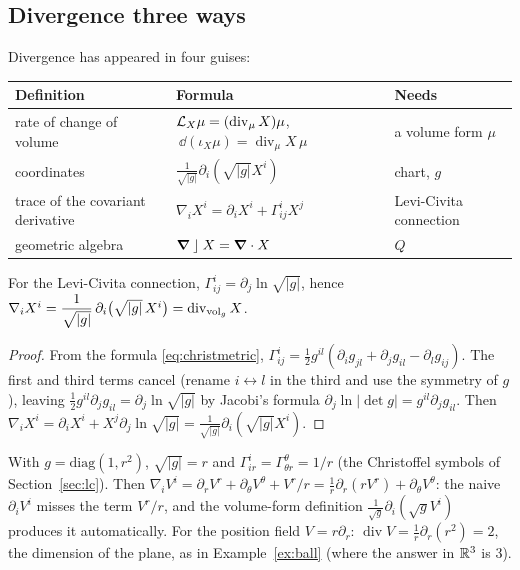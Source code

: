 \subsection{Divergence three ways}\label{sec:divthree}

Divergence has appeared in four guises:
\begin{center}
\small
\begin{tabular}{@{}p{4.1cm}p{5.4cm}p{4.6cm}@{}}
\toprule
\textbf{Definition} & \textbf{Formula} & \textbf{Needs}\\
\midrule
rate of change of volume & $\mathcal{L}_X\mu=(\operatorname{div}_\mu X)\mu$, $\ \dd(\iota_X\mu)=\operatorname{div}_\mu X\,\mu$ & a volume form $\mu$\\
coordinates & $\frac1{\sqrt{|g|}}\partial_i(\sqrt{|g|}X^i)$ & chart, $g$\\
trace of the covariant derivative & $\nabla_iX^i=\partial_iX^i+\Gamma^i_{ij}X^j$ & Levi-Civita connection\\
geometric algebra & $\boldsymbol{\nabla}\mathbin{\rfloor} X=\boldsymbol{\nabla}\cdot X$ & $Q$\\
\bottomrule
\end{tabular}
\end{center}

\begin{proposition}\label{prop:divagree}
For the Levi-Civita connection, $\Gamma^i_{ij}=\partial_j\ln\sqrt{|g|}$, hence $\nabla_iX^i=\dfrac1{\sqrt{|g|}}\,\partial_i\bigl(\sqrt{|g|}\,X^i\bigr)=\operatorname{div}_{\mathrm{vol}_g}X$.
\end{proposition}
\begin{proof}
From the formula \eqref{eq:christmetric}, $\Gamma^i_{ij}=\frac12g^{il}(\partial_ig_{jl}+\partial_jg_{il}-\partial_lg_{ij})$. The first and third terms cancel (rename $i\leftrightarrow l$ in the third and use the symmetry of $g$), leaving $\frac12g^{il}\partial_jg_{il}=\partial_j\ln\sqrt{|g|}$ by Jacobi's formula $\partial_j\ln|\det g|=g^{il}\partial_jg_{il}$. Then $\nabla_iX^i=\partial_iX^i+X^j\partial_j\ln\sqrt{|g|}=\frac1{\sqrt{|g|}}\partial_i(\sqrt{|g|}X^i)$.
\end{proof}

\begin{example}\label{ex:polardiv}
With $g=\mathrm{diag}(1,r^2)$, $\sqrt{|g|}=r$ and $\Gamma^i_{ir}=\Gamma^\theta_{\theta r}=1/r$ (the Christoffel symbols of Section~\ref{sec:lc}). Then $\nabla_iV^i=\partial_rV^r+\partial_\theta V^\theta+V^r/r=\frac1r\partial_r(rV^r)+\partial_\theta V^\theta$: the naive $\partial_iV^i$ misses the term $V^r/r$, and the volume-form definition $\frac1{\sqrt g}\partial_i(\sqrt gV^i)$ produces it automatically. For the position field $V=r\partial_r$: $\operatorname{div}V=\frac1r\partial_r(r^2)=2$, the dimension of the plane, as in Example~\ref{ex:ball} (where the answer in $\mathbb{R}^3$ is $3$).
\end{example}
